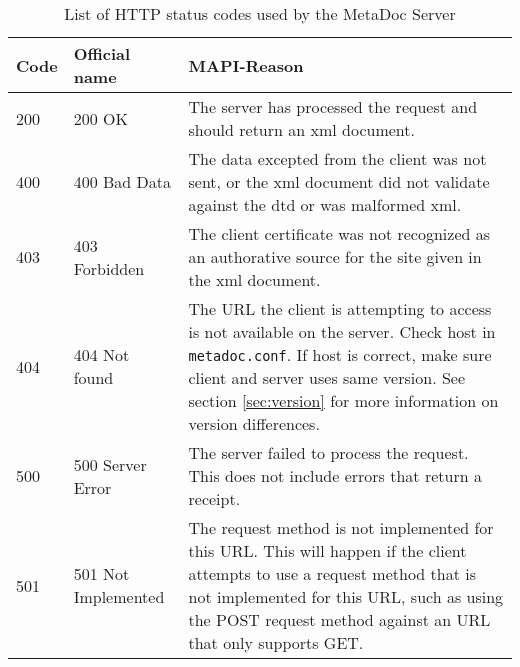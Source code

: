 \begin{table}[h!]
    \centering
    \caption{List of HTTP status codes used by the MetaDoc Server}
    \begin{tabular}{|l|l|p{7cm}|}
        \hline
        \textbf{Code} & \textbf{Official name} & \textbf{MAPI-Reason} \\
        \hline
        200 & 200 OK & The server has processed the request and should return
        an \gls{xml} document. \\
        \hline
        400 & 400 Bad Data & The data excepted from the client was not sent, or
        the \gls{xml} document did not validate against the \gls{dtd} or was
        malformed \gls{xml}. \\
        \hline
        403 & 403 Forbidden & The client certificate was not recognized as an
        authorative source for the site given in the \gls{xml} document. \\
        \hline
        404 & 404 Not found & The URL the client is attempting to access is not
        available on the server. Check host in \texttt{metadoc.conf}. If host
        is correct, make sure client and server uses same version. See section
        \ref{sec:version} for more information on version differences. \\ 
        \hline
        500 & 500 Server Error & The server failed to process the request. This
        does not include errors that return a receipt. \\
        \hline
        501 & 501 Not Implemented & The request method is not implemented for
        this URL. This will happen if the client attempts to use a request
        method that is not implemented for this URL, such as using the POST
        request method against an URL that only supports GET. \\
        \hline
    \end{tabular}
    \label{tbl:http_status_codes}
\end{table}
